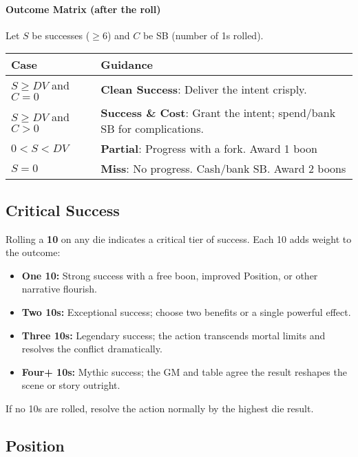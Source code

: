\paragraph{Outcome Matrix (after the roll)}
Let $S$ be successes ($\geq 6$) and $C$ be SB (number of 1s rolled).
\begin{center}
\begin{tabular}{@{}ll@{}}
\toprule
\textbf{Case} & \textbf{Guidance} \\
\midrule
$S \geq DV$ and $C=0$ & \textbf{Clean Success}: Deliver the intent crisply. \\
$S \geq DV$ and $C>0$ & \textbf{Success \& Cost}: Grant the intent; spend/bank SB for complications. \\
$0 < S < DV$          & \textbf{Partial}: Progress with a fork. Award 1 boon \\
$S = 0$               & \textbf{Miss}: No progress. Cash/bank SB. Award 2 boons \\
\bottomrule
\end{tabular}
\end{center}

\subsection{Critical Success}
Rolling a \textbf{10} on any die indicates a critical tier of success. Each 10 adds weight to the outcome:

\begin{itemize}
  \item \textbf{One 10:} Strong success with a free boon, improved Position, or other narrative flourish.
  \item \textbf{Two 10s:} Exceptional success; choose two benefits or a single powerful effect.
  \item \textbf{Three 10s:} Legendary success; the action transcends mortal limits and resolves the conflict dramatically.
  \item \textbf{Four+ 10s:} Mythic success; the GM and table agree the result reshapes the scene or story outright.
\end{itemize}

\noindent
If no 10s are rolled, resolve the action normally by the highest die result.

\subsection{Position}
\label{subsec:position}

